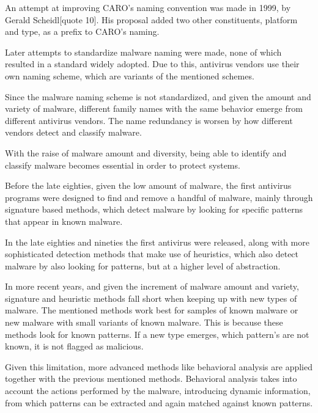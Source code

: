 \documentclass{llncs}
\begin{document}
An attempt at improving CARO's naming convention was made in 1999, by Gerald Scheidl[quote 10]. His proposal added two other constituents, platform and type, as a prefix to CARO's naming.

Later attempts to standardize malware naming were made, none of which resulted in a standard widely adopted. Due to this, antivirus vendors use their own naming scheme, which are variants of the mentioned schemes.

Since the malware naming scheme is not standardized, and given the amount and variety of malware, different family names with the same behavior emerge from different antivirus vendors. The name redundancy is worsen by how different vendors detect and classify malware.

With the raise of malware amount and diversity, being able to identify and classify malware becomes essential in order to protect systems.

Before the late eighties, given the low amount of malware, the first antivirus programs were designed to find and remove a handful of malware, mainly through signature based methods, which detect malware by looking for specific patterns that appear in known malware.

In the late eighties and nineties the first antivirus were released, along with more sophisticated detection methods that make use of heuristics, which also detect malware by also looking for patterns, but at a higher level of abstraction.

In more recent years, and given the increment of malware amount and variety, signature and heuristic methods fall short when keeping up with new types of malware. The mentioned methods work best for samples of known malware or new malware with small variants of known malware. This is because these methods look for known patterns. If a new type emerges, which pattern's are not known, it is not flagged as malicious.

Given this limitation, more advanced methods like behavioral analysis are applied together with the previous mentioned methods. Behavioral analysis takes into account the actions performed by the malware, introducing dynamic information, from which patterns can be extracted and again matched against known patterns. 

\end{document}
